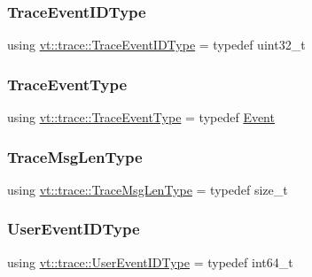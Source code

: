 \subsubsection{\texorpdfstring{Trace\+Event\+I\+D\+Type}{TraceEventIDType}}
{\footnotesize\ttfamily using \hyperlink{namespacevt_1_1trace_a64a7185f3e102df8d8258f263ccd1582}{vt\+::trace\+::\+Trace\+Event\+I\+D\+Type} = typedef uint32\+\_\+t}

\mbox{\label{namespacevt_1_1trace_a79b7fa947245c08d04a3ea67fbff2c30}} 
\subsubsection{\texorpdfstring{Trace\+Event\+Type}{TraceEventType}}
{\footnotesize\ttfamily using \hyperlink{namespacevt_1_1trace_a79b7fa947245c08d04a3ea67fbff2c30}{vt\+::trace\+::\+Trace\+Event\+Type} = typedef \hyperlink{structvt_1_1trace_1_1_event}{Event}}

\mbox{\label{namespacevt_1_1trace_aeb598f45d67d41db7902e494f2f0ce59}} 
\subsubsection{\texorpdfstring{Trace\+Msg\+Len\+Type}{TraceMsgLenType}}
{\footnotesize\ttfamily using \hyperlink{namespacevt_1_1trace_aeb598f45d67d41db7902e494f2f0ce59}{vt\+::trace\+::\+Trace\+Msg\+Len\+Type} = typedef size\+\_\+t}

\mbox{\label{namespacevt_1_1trace_a5908920d051c144c89f17c69ed262350}} 
\subsubsection{\texorpdfstring{User\+Event\+I\+D\+Type}{UserEventIDType}}
{\footnotesize\ttfamily using \hyperlink{namespacevt_1_1trace_a5908920d051c144c89f17c69ed262350}{vt\+::trace\+::\+User\+Event\+I\+D\+Type} = typedef int64\+\_\+t}

